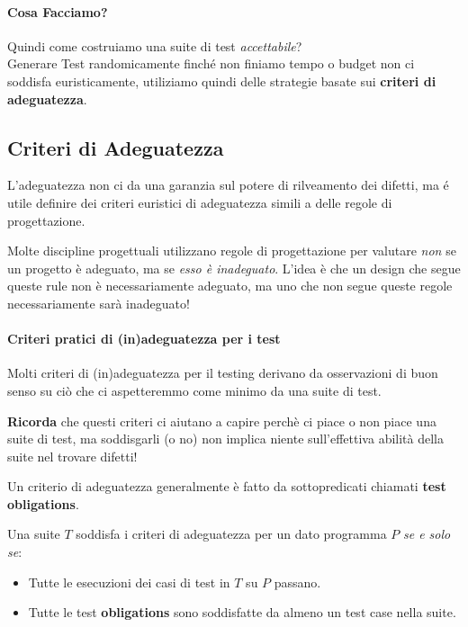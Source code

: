 \paragraph{Cosa Facciamo?}
Quindi come costruiamo una suite di test \emph{accettabile}?
\\Generare Test randomicamente finché non finiamo tempo o budget non ci soddisfa euristicamente, utiliziamo quindi 
delle strategie basate sui \textbf{criteri di adeguatezza}.

\subsection{Criteri di Adeguatezza}
L'adeguatezza non ci da una garanzia sul potere di rilveamento dei difetti, ma é utile definire dei criteri euristici di adeguatezza simili a delle regole di progettazione.

Molte discipline progettuali utilizzano regole di progettazione per valutare \emph{non} se un progetto è adeguato, ma se \emph{esso è inadeguato}.
L'idea è che un design che segue queste rule non è necessariamente adeguato, ma uno che non segue queste regole necessariamente sarà inadeguato!

\paragraph{Criteri pratici di (in)adeguatezza per i test}
Molti criteri di (in)adeguatezza per il testing derivano da osservazioni di buon senso su ciò che ci aspetteremmo come minimo da una suite di test.

\textbf{Ricorda} che questi criteri ci aiutano a capire perchè ci piace o non piace una suite di test,
ma soddisgarli (o no) non implica niente sull'effettiva abilità della suite nel trovare difetti!

Un criterio di adeguatezza generalmente è fatto da sottopredicati chiamati \textbf{test obligations}.

Una suite $T$ soddisfa i criteri di adeguatezza per un dato programma $P$ \emph{se e solo se}:
\begin{itemize}
    \item Tutte le esecuzioni dei casi di test in $T$ su $P$ passano.
    \item Tutte le test \textbf{obligations} sono soddisfatte da almeno un test case nella suite.
\end{itemize}

